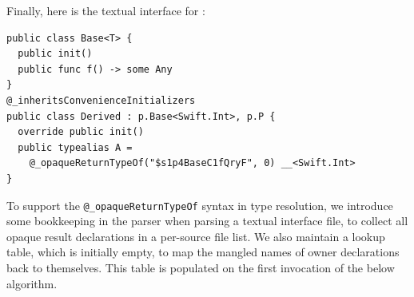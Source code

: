 \documentclass[../generics]{subfiles}
\begin{document}
\begin{example}
Finally, here is the textual interface for :
\begin{Verbatim}
public class Base<T> {
  public init()
  public func f() -> some Any
}
@_inheritsConvenienceInitializers
public class Derived : p.Base<Swift.Int>, p.P {
  override public init()
  public typealias A =
    @_opaqueReturnTypeOf("$s1p4BaseC1fQryF", 0) __<Swift.Int>
}
\end{Verbatim}
\end{example}

To support the \verb|@_opaqueReturnTypeOf| syntax in type resolution, we introduce some bookkeeping in the parser when parsing a textual interface file, to collect all opaque result declarations in a per-source file list. We also maintain a lookup table, which is initially empty, to map the mangled names of owner declarations back to themselves. This table is populated on the first invocation of the below algorithm.
\end{document}
